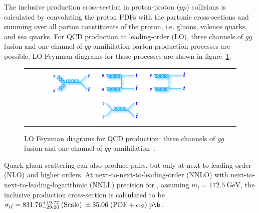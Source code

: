 \begin{refsection}
The inclusive \ttbar production cross-section in proton-proton ($pp$) collisions is calculated by convoluting the proton PDFs with the partonic cross-sections and summing over all parton constituents of the proton, i.e. gluons, valence quarks, and sea quarks.
For QCD \ttbar production at leading-order (LO), three channels of $gg$ fusion and one channel of $q\bar{q}$ annihilation parton production processes are possible.
LO Feynman diagrams for these processes are shown in figure~\ref{ttbar_production_LO_feynman_diagrams}.
\begin{figure}[htb]
  \begin{center}
    \begin{tabular}{cccc}
        \includegraphics[width=0.245\textwidth]{fig_TopQuark/feynman_ttbar_LHC_gggtt.png}
        \includegraphics[width=0.245\textwidth]{fig_TopQuark/feynman_ttbar_LHC_ggttt.png}
        \includegraphics[width=0.245\textwidth]{fig_TopQuark/feynman_ttbar_LHC_ggttbart.png}
        \includegraphics[width=0.245\textwidth]{fig_TopQuark/feynman_ttbar_LHC_qqgtt.png}
    \end{tabular}
    \caption{LO Feynman diagrams for QCD \ttbar production: three channels of $gg$ fusion and one channel of $q\bar{q}$ annihilation~\cite{d0_diagrams}.
            }
    \label{ttbar_production_LO_feynman_diagrams}
  \end{center}
\end{figure}
Quark-gluon scattering can also produce \ttbar pairs, but only at next-to-leading-order (NLO) and higher orders.
At next-to-next-to-leading-order (NNLO) with next-to-next-to-leading-logarithmic (NNLL) precision for \beamenergy, assuming $m_t = \SI{172.5}{\GeV}$, the inclusive \ttbar production cross-section is calculated to be $\sigma_{\ttbar} = 831.76 \substack{+19.77 \\ -29.20} \; (\text{Scale}) \; \pm 35.06 \; (\text{PDF} + \alpha_S) \; \si{\pico \b}$.

\end{refsection}
